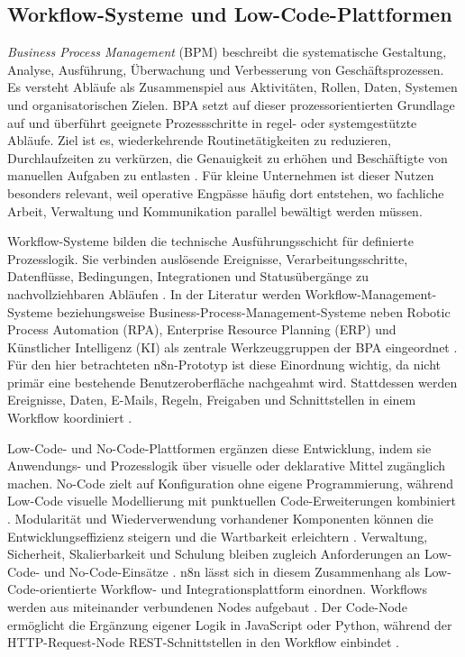 \documentclass[a4paper,12pt]{article}
\begin{document}
\subsection{Workflow-Systeme und Low-Code-Plattformen}
\textit{Business Process Management} (BPM) beschreibt die systematische Gestaltung, Analyse, Ausführung, Überwachung und Verbesserung von Geschäftsprozessen. Es versteht Abläufe als Zusammenspiel aus Aktivitäten, Rollen, Daten, Systemen und organisatorischen Zielen. BPA setzt auf dieser prozessorientierten Grundlage auf und überführt geeignete Prozessschritte in regel- oder systemgestützte Abläufe. Ziel ist es, wiederkehrende Routinetätigkeiten zu reduzieren, Durchlaufzeiten zu verkürzen, die Genauigkeit zu erhöhen und Beschäftigte von manuellen Aufgaben zu entlasten \parencite{moreira_business_2024}. Für kleine Unternehmen ist dieser Nutzen besonders relevant, weil operative Engpässe häufig dort entstehen, wo fachliche Arbeit, Verwaltung und Kommunikation parallel bewältigt werden müssen.

Workflow-Systeme bilden die technische Ausführungsschicht für definierte Prozesslogik. Sie verbinden auslösende Ereignisse, Verarbeitungsschritte, Datenflüsse, Bedingungen, Integrationen und Statusübergänge zu nachvollziehbaren Abläufen \parencite{moreira_business_2024}. In der Literatur werden Workflow-Management-Systeme beziehungsweise Business-Process-Management-Systeme neben Robotic Process Automation (RPA), Enterprise Resource Planning (ERP) und Künstlicher Intelligenz (KI) als zentrale Werkzeuggruppen der BPA eingeordnet \parencite{moreira_business_2024}. Für den hier betrachteten n8n-Prototyp ist diese Einordnung wichtig, da nicht primär eine bestehende Benutzeroberfläche nachgeahmt wird. Stattdessen werden Ereignisse, Daten, E-Mails, Regeln, Freigaben und Schnittstellen in einem Workflow koordiniert \parencite{n8n_docs_2026,venkiteela_n8n_2025}.

Low-Code- und No-Code-Plattformen ergänzen diese Entwicklung, indem sie Anwendungs- und Prozesslogik über visuelle oder deklarative Mittel zugänglich machen. No-Code zielt auf Konfiguration ohne eigene Programmierung, während Low-Code visuelle Modellierung mit punktuellen Code-Erweiterungen kombiniert \parencite{abendroth_werkzeug_2024}. Modularität und Wiederverwendung vorhandener Komponenten können die Entwicklungseffizienz steigern und die Wartbarkeit erleichtern \parencite{abendroth_werkzeug_2024}. Verwaltung, Sicherheit, Skalierbarkeit und Schulung bleiben zugleich Anforderungen an Low-Code- und No-Code-Einsätze \parencite{ozman_systematic_2025}. n8n lässt sich in diesem Zusammenhang als Low-Code-orientierte Workflow- und Integrationsplattform einordnen. Workflows werden aus miteinander verbundenen Nodes aufgebaut \parencite{n8n_docs_2026}. Der Code-Node ermöglicht die Ergänzung eigener Logik in JavaScript oder Python, während der HTTP-Request-Node REST-Schnittstellen in den Workflow einbindet \parencite{n8n_docs_2026}. 
\end{document}
